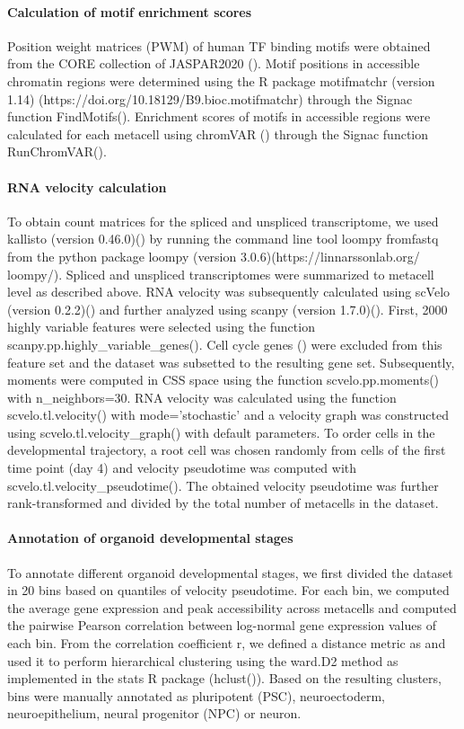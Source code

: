 \paragraph{Calculation of motif enrichment scores}
Position weight matrices (PWM) of human TF binding motifs were obtained from the CORE collection of JASPAR2020 (\cite{fornes_jaspar_2020}). Motif positions in accessible chromatin regions were determined using the R package motifmatchr (version 1.14) (https://doi.org/10.18129/B9.bioc.motifmatchr) through the Signac function FindMotifs(). Enrichment scores of motifs in accessible regions were calculated for each metacell using chromVAR (\cite{schep_chromvar_2017}) through the Signac function RunChromVAR().
 
\paragraph{RNA velocity calculation}
To obtain count matrices for the spliced and unspliced transcriptome, we used kallisto (version 0.46.0)(\cite{bray_near-optimal_2016}) by running the command line tool loompy fromfastq  from the python package loompy (version 3.0.6)(https://linnarssonlab.org/\\ loompy/). Spliced and unspliced transcriptomes were summarized to metacell level as described above. RNA velocity was subsequently calculated using scVelo (version 0.2.2)(\cite{bergen_generalizing_2020}) and further analyzed using scanpy (version 1.7.0)(\cite{wolf_scanpy_2018}). First, 2000 highly variable features were selected using the function scanpy.pp.highly\_variable\_genes(). Cell cycle genes (\cite{tirosh_dissecting_2016}) were excluded from this feature set and the dataset was subsetted to the resulting gene set. Subsequently, moments were computed in CSS space using the function scvelo.pp.moments() with n\_neighbors=30. RNA velocity was calculated using the function scvelo.tl.velocity() with mode='stochastic' and a velocity graph was constructed using scvelo.tl.velocity\_graph() with default parameters. To order cells in the developmental trajectory, a root cell was chosen randomly from cells of the first time point (day 4) and velocity pseudotime was computed with scvelo.tl.velocity\_pseudotime().  The obtained velocity pseudotime was further rank-transformed and divided by the total number of metacells in the dataset.
 
\paragraph{Annotation of organoid developmental stages}
To annotate different organoid developmental stages, we first divided the dataset in 20 bins based on quantiles of velocity pseudotime. For each bin, we computed the average gene expression and peak accessibility across metacells and computed the pairwise Pearson correlation between log-normal gene expression values of each bin. From the correlation coefficient r, we defined a distance metric as  and used it to perform hierarchical clustering using the ward.D2 method as implemented in the stats R package (hclust()). Based on the resulting clusters, bins were manually annotated as pluripotent (PSC), neuroectoderm, neuroepithelium, neural progenitor (NPC) or neuron.
 
